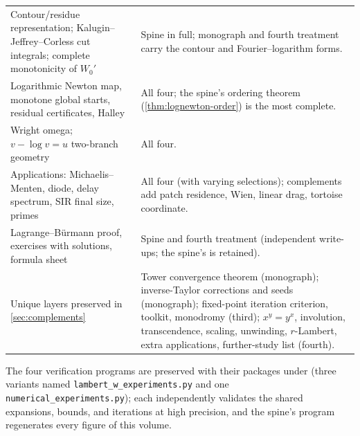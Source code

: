 \documentclass[11pt]{article}
\theoremstyle{remark}
\begin{document}
\begin{longtable}{@{}p{}p{}@{}}
\addlinespace
Contour/residue representation; Kalugin--Jeffrey--Corless cut integrals;
complete monotonicity of \(W_0'\) &
Spine in full; monograph and fourth treatment carry the contour and
Fourier--logarithm forms.\\
\addlinespace
Logarithmic Newton map, monotone global starts, residual certificates,
Halley &
All four; the spine's ordering theorem
(\cref{thm:lognewton-order}) is the most complete.\\
\addlinespace
Wright omega; \(v-\log v=u\) two-branch geometry &
All four.\\
\addlinespace
Applications: Michaelis--Menten, diode, delay spectrum, SIR final size,
primes &
All four (with varying selections); complements add patch residence, Wien,
linear drag, tortoise coordinate.\\
\addlinespace
Lagrange--B\"urmann proof, exercises with solutions, formula sheet &
Spine and fourth treatment (independent write-ups; the spine's is
retained).\\
\addlinespace
Unique layers preserved in \cref{sec:complements} &
Tower convergence theorem (monograph); inverse-Taylor corrections and seeds
(monograph); fixed-point iteration criterion, toolkit, monodromy (third);
\(x^y=y^x\), involution, transcendence, scaling, unwinding, \(r\)-Lambert,
extra applications, further-study list (fourth).\\
\bottomrule
\end{longtable}

The four verification programs are preserved with their packages under
 (three variants named
\texttt{lambert\_w\_experiments.py} and one
\texttt{numerical\_experiments.py}); each independently validates the shared
expansions, bounds, and iterations at high precision, and the spine's
program regenerates every figure of this volume.
\end{document}

